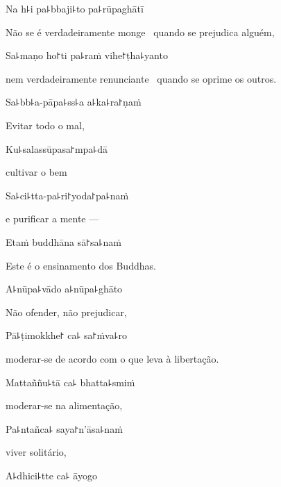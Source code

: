 Na h꜕i pa꜕bbaji꜕to pa꜕rūpaghātī

\begin{english}
  Não se é verdadeiramente monge \pause\ quando se prejudica alguém,
\end{english}

Sa꜕maṇo ho꜓ti pa꜕raṁ vihe꜓ṭha꜕yanto

\begin{english}
  nem verdadeiramente renunciante \pause\ quando se oprime os outros.
\end{english}

Sa꜕bb꜕a-pāpa꜕ss꜕a a꜕ka꜕ra꜓ṇaṁ

\begin{english}
  Evitar todo o mal,
\end{english}

Ku꜕salassūpasa꜓mpa꜕dā

\begin{english}
  cultivar o bem
\end{english}

Sa꜕ci꜕tta-pa꜕ri꜓yoda꜓pa꜕naṁ

\begin{english}
  e purificar a mente ---
\end{english}

Etaṁ buddhāna sā꜓sa꜕naṁ

\begin{english}
  Este é o ensinamento dos Buddhas.
\end{english}

A꜕nūpa꜕vādo a꜕nūpa꜕ghāto

\begin{english}
  Não ofender, não prejudicar,
\end{english}

Pā꜕ṭimokkhe꜓ ca꜕ sa꜓ṁva꜕ro

\begin{english}
  moderar-se de acordo com o que leva à libertação.
\end{english}

Mattaññu꜕tā ca꜕ bhatta꜕smiṁ

\begin{english}
  moderar-se na alimentação,
\end{english}

Pa꜕ntañca꜕ saya꜓n'āsa꜕naṁ

\begin{english}
  viver solitário,
\end{english}

A꜕dhici꜕tte ca꜕ āyogo

